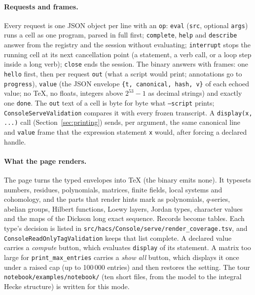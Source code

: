 \documentclass[11pt,openany]{report}
\newcommand{\cli}[1]{\texttt{#1}}
\newcommand{\file}[1]{\nolinkurl{#1}}
\newcommand{\vb}[1]{\texttt{#1}}
\begin{document}


\paragraph{Requests and frames.} Every request is one JSON object per line with an \texttt{op}:
\texttt{eval} (\texttt{src}, optional \texttt{args}) runs a cell as one program, parsed in full first;
\texttt{complete}, \texttt{help} and \texttt{describe} answer from the registry and the session without
evaluating; \texttt{interrupt} stops the running cell at its next cancellation point (a statement, a verb call, or a loop step inside a long verb); \texttt{close}
ends the session. The binary answers with frames: one \texttt{hello} first, then per request
\texttt{out} (what a script would print; annotations go to \texttt{progress}), \texttt{value} (the
JSON envelope \texttt{\{t, canonical, hash, v\}} of each echoed value; no \TeX, no floats, integers above
$2^{53}-1$ as decimal strings) and exactly one \texttt{done}. The \texttt{out} text of a cell is byte for
byte what \cli{--script} prints; \vb{ConsoleServeValidation} compares it with every frozen transcript.
A \vb{display(x, ...)} call (Section~\ref{sec:printing}) sends, per argument, the same canonical line and
\texttt{value} frame that the expression statement \texttt{x} would, after forcing a declared handle.

\paragraph{What the page renders.} The page turns the typed envelopes into \TeX{} (the binary emits none). It typesets
numbers, residues, polynomials, matrices, finite fields, local systems and cohomology, and the parts that render hints
mark as polynomials, $q$-series, abelian groups, Hilbert functions, Loewy layers, Jordan types, character values and the
maps of the Dickson long exact sequence. Records become tables. Each type's decision is listed in
\file{src/hacs/Console/serve/render_coverage.tsv}, and \vb{ConsoleReadOnlyTagValidation} keeps that list
complete. A declared value carries a \emph{compute} button, which evaluates \vb{display} of its statement. A matrix too
large for \vb{print\_max\_entries} carries a \emph{show all} button, which displays it once under a raised cap (up to
100\,000 entries) and then restores the setting. The tour \file{notebook/examples/notebook/} (ten short files, from the
model to the integral Hecke structure) is written for this mode.
\end{document}
